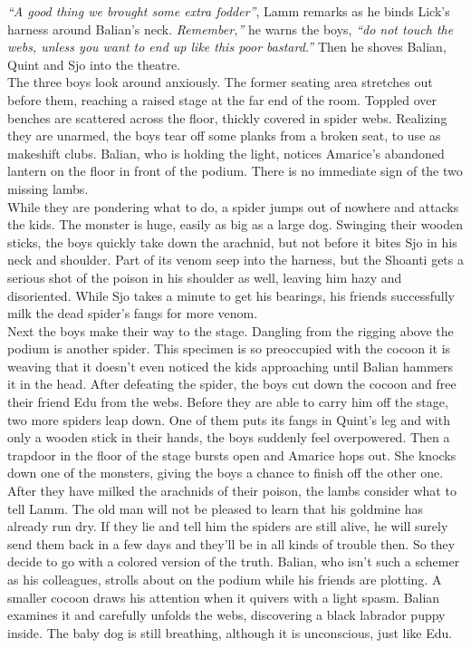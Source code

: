{\itshape ``A good thing we brought some extra fodder''}, Lamm remarks as he binds Lick's harness around Balian's neck. {\itshape Remember,''} he warns the boys, {\itshape ``do not touch the webs, unless you want to end up like this poor bastard.''} Then he shoves Balian, Quint and Sjo into the theatre.\\

The three boys look around anxiously. The former seating area stretches out before them, reaching a raised stage at the far end of the room. Toppled over benches are scattered across the floor, thickly covered in spider webs. Realizing they are unarmed, the boys tear off some planks from a broken seat, to use as makeshift clubs. Balian, who is holding the light, notices Amarice's abandoned lantern on the floor in front of the podium. There is no immediate sign of the two missing lambs.\\

While they are pondering what to do, a spider jumps out of nowhere and attacks the kids. The monster is huge, easily as big as a large dog. Swinging their wooden sticks, the boys quickly take down the arachnid, but not before it bites Sjo in his neck and shoulder. Part of its venom seep into the harness, but the Shoanti gets a serious shot of the poison in his shoulder as well, leaving him hazy and disoriented. While Sjo takes a minute to get his bearings, his friends successfully milk the dead spider's fangs for more venom.\\

Next the boys make their way to the stage. Dangling from the rigging above the podium is another spider. This specimen is so preoccupied with the cocoon it is weaving that it doesn't even noticed the kids approaching until Balian hammers it in the head. After defeating the spider, the boys cut down the cocoon and free their friend Edu from the webs. Before they are able to carry him off the stage, two more spiders leap down. One of them puts its fangs in Quint's leg and with only a wooden stick in their hands, the boys suddenly feel overpowered. Then a trapdoor in the floor of the stage bursts open and Amarice hops out. She knocks down one of the monsters, giving the boys a chance to finish off the other one.\\

After they have milked the arachnids of their poison, the lambs consider what to tell Lamm. The old man will not be pleased to learn that his goldmine has already run dry. If they lie and tell him the spiders are still alive, he will surely send them back in a few days and they'll be in all kinds of trouble then. So they decide to go with a colored version of the truth. Balian, who isn't such a schemer as his colleagues, strolls about on the podium while his friends are plotting. A smaller cocoon draws his attention when it quivers with a light spasm. Balian examines it and carefully unfolds the webs, discovering a black labrador puppy inside. The baby dog is still breathing, although it is unconscious, just like Edu.\\


